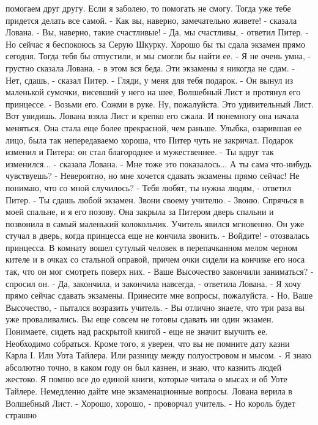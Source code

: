 помогаем друг другу. Если я заболею, то помогать не смогу. Тогда уже 
тебе придется делать все самой.
    - Как вы, наверно, замечательно живете! - сказала Лована. - Вы, 
наверно, такие счастливые!
    - Да, мы счастливы, - ответил Питер. - Но сейчас я беспокоюсь за 
Серую Шкурку. Хорошо бы ты сдала экзамен прямо сегодня. Тогда тебя бы 
отпустили, и мы смогли бы найти ее.
    - Я не очень умна, - грустно сказала Лована, - в этом вся беда. 
Эти экзамены я никогда не сдам.
    - Нет, сдашь, - сказал Питер. - Гляди, у меня для тебя подарок. - 
Он вынул из маленькой сумочки, висевший у него на шее, Волшебный Лист 
и протянул его принцессе. - Возьми его. Сожми в руке. Ну, пожалуйста. 
Это удивительный Лист. Вот увидишь.
    Лована взяла Лист и крепко его сжала. И понемногу она начала 
меняться. Она стала еще более прекрасной, чем раньше. Улыбка, 
озарившая ее лицо, была так непередаваемо хороша, что Питер чуть не 
закричал.
    Подарок изменил и Питера: он стал благороднее и мужественнее.
    - Ты вдруг так изменился... - сказала Лована.
    - Мне тоже это показалось... А ты сама что-нибудь чувствуешь?
    - Невероятно, но мне хочется сдавать экзамены прямо сейчас! Не 
понимаю, что со мной случилось?
    - Тебя любят, ты нужна людям, - ответил Питер. - Ты сдашь любой 
экзамен. Звони своему учителю.
    - Звоню. Спрячься в моей спальне, и я его позову.
    Она закрыла за Питером дверь спальни и позвонила в самый маленький 
колокольчик. Учитель явился мгновенно. Он уже стучал в дверь, когда 
принцесса еще не кончила звонить.
    - Войдите! - отозвалась принцесса. В комнату вошел сутулый человек 
в перепачканном мелом черном кителе и в очках со стальной оправой, 
причем очки сидели на кончике его носа так, что он мог смотреть поверх 
них.
    - Ваше Высочество закончили заниматься? - спросил он.
    - Да, закончила, и закончила навсегда, - ответила Лована. - Я хочу 
прямо сейчас сдавать экзамены. Принесите мне вопросы, пожалуйста.
    - Но, Ваше Высочество, - пытался возразить учитель. - Вы отлично 
знаете, что три раза вы уже проваливались. Вы еще совсем не готовы 
сдавать ни один экзамен. Понимаете, сидеть над раскрытой книгой - еще 
не значит выучить ее. Необходимо собраться. Кроме того, я уверен, что 
вы не помните дату казни Карла I. Или Уота Тайлера. Или разницу между 
полуостровом и мысом.
    - Я знаю абсолютно точно, в каком году он был казнен, и знаю, что 
казнить людей жестоко. Я помню все до единой книги, которые читала о 
мысах и об Уоте Тайлере. Немедленно дайте мне экзаменационные вопросы.
    Лована верила в Волшебный Лист.
    - Хорошо, хорошо, - проворчал учитель. - Но король будет страшно 
